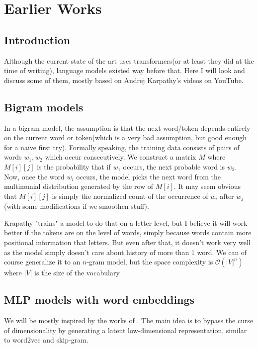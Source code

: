 \chapterspaceabove{6.25cm} %
\chapterspacebelow{8.5cm} %


\chapter{Earlier Works}
\section{Introduction}
Although the current state of the art uses transformers(or at least they did at the time of writing), language models existed way before that. Here I will look and discuss some of them, mostly based on Andrej Karpathy's videos on YouTube.


\section{Bigram models}
In a bigram model, the assumption is that the next word/token depends entirely on the current word or token(which is a very bad assumption, but good enough for a naive first try). Formally speaking, the training data consists of pairs of words $w_1,w_2$ which occur consecutively. We construct a matrix $M$ where $M[i][j]$ is the probability that if $w_1$ occurs, the next probable word is $w_2$. Now, once the word $w_i$ occurs, the model picks the next word from the multinomial distribution generated by the row of $M[i]$. It may seem obvious that  $M[i][j]$ is simply the normalized count of the occurrence of $w_i$ after $w_j$(with some modifications if we smoothen stuff).   


Krapathy "trains" a model to do that on a letter level, but I believe it will work better if the tokens are on the level of words, simply because words contain more positional information that letters.  But even after that, it doesn't work very well as the model simply doesn't care about history of more than 1 word. We can of course generalize it to an $n$-gram model, but the space complexity is $\mathcal O(|V|^n)$ where $|V|$ is the size of the vocabulary. 


\section{MLP models with word embeddings}
We will be mostly inspired by the works of \cite{bengio2000neural}. The main idea is to bypass the curse of dimensionality by generating a latent low-dimensional representation, similar to word2vec and skip-gram. 